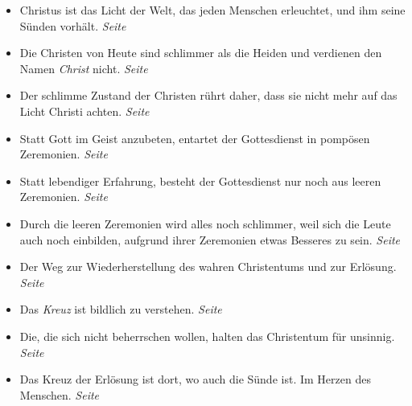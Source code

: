 \begin{itemize}
 \item Christus ist das Licht der Welt, das jeden Menschen erleuchtet, und ihm
seine Sünden vorhält.
 \dotfill \textit{Seite~\pageref{ref:02_03_gott_in_jedem}}\\

 \item Die Christen von Heute sind schlimmer als die Heiden und verdienen den
Namen \textit{Christ} nicht.
 \dotfill \textit{Seite~\pageref{ref:02_08_schlimmer_als_heiden}}\\

 \item Der schlimme Zustand der Christen rührt daher, dass sie nicht mehr auf das
Licht Christi achten.
 \dotfill \textit{Seite~\pageref{ref:02_08_ursache_des_abfalls}}\\
 \item Statt Gott im Geist anzubeten, entartet der Gottesdienst in pompösen
Zeremonien.
 \dotfill \textit{Seite~\pageref{ref:02_08_falscher_gottesdienst}}\\

 \item Statt lebendiger Erfahrung, besteht der Gottesdienst nur noch aus leeren
Zeremonien. \dotfill \textit{Seite~\pageref{ref:02_09_lebendige_erfahrung}}\\

 \item Durch die leeren Zeremonien wird alles noch schlimmer, weil sich die
Leute auch noch einbilden, aufgrund ihrer Zeremonien etwas Besseres zu sein.
 \dotfill \textit{Seite~\pageref{ref:02_09_selbstueberschaetzung}}\\

 \item Der Weg zur Wiederherstellung des wahren Christentums und zur Erlösung.
 \dotfill \textit{Seite~\pageref{ref:02_10_abhilfe}}\\

 \item Das \textit{Kreuz} ist bildlich zu verstehen.
 \dotfill \textit{Seite~\pageref{ref:03_01_das_kreuz}}\\

 \item Die, die sich nicht beherrschen wollen, halten das Christentum für
unsinnig.
 \dotfill \textit{Seite~\pageref{ref:03_02_leidenschaft}}\\

 \item Das Kreuz der Erlösung ist dort, wo auch die Sünde ist. Im Herzen des Menschen.
 \dotfill \textit{Seite~\pageref{ref:03_03_ort_des_kreuzes}}\\


\end{itemize}
